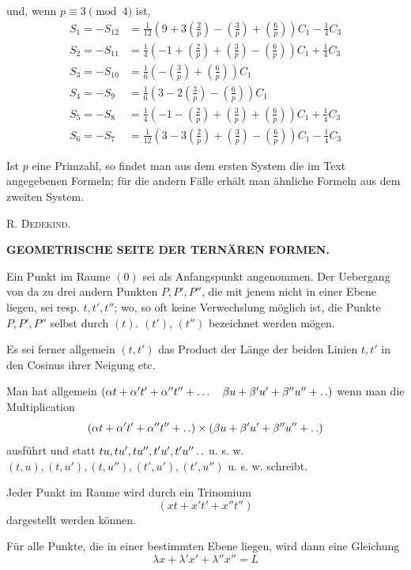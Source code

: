 und, wenn $p\equiv3\pmod4$ ist,
\[
\begin{aligned}
S_1=-S_{12}&=\tfrac1{12}\left(9+3\left(\frac2p\right)-\left(\frac3p\right)+\left(\frac6p\right)\right)C_1-\tfrac14C_3\\
S_2=-S_{11}&=\tfrac14\left(-1+\left(\frac2p\right)+\left(\frac3p\right)-\left(\frac6p\right)\right)C_1+\tfrac14C_3\\
S_3=-S_{10}&=\tfrac16\left(-\left(\frac3p\right)+\left(\frac6p\right)\right)C_1\\
S_4=-S_9&=\tfrac16\left(3-2\left(\frac3p\right)-\left(\frac6p\right)\right)C_1\\
S_5=-S_8&=\tfrac14\left(-1-\left(\frac2p\right)+\left(\frac3p\right)+\left(\frac6p\right)\right)C_1+\tfrac14C_3\\
S_6=-S_7&=\tfrac1{12}\left(3-3\left(\frac2p\right)+\left(\frac3p\right)-\left(\frac6p\right)\right)C_1-\tfrac14C_3
\end{aligned}
\]

Ist $p$ eine Primzahl, so findet man aus dem ersten System die im Text angegebenen Formeln; für die andern Fälle erhält man ähnliche Formeln aus dem zweiten System.
\begin{flushright}\textsc{R. Dedekind.}\end{flushright}
\BookRule{55mm}

\clearpage
\renewcommand{\BookRunningTitle}{Geometrische Seite der ternären Formen}
%
\begin{center}\Large\bfseries GEOMETRISCHE SEITE DER TERNÄREN FORMEN.\end{center}
\BookRule{30mm}

Ein Punkt im Raume $(0)$ sei als Anfangspunkt angenommen. Der Uebergang von da zu drei andern Punkten $P,P',P''$, die mit jenem nicht in einer Ebene liegen, sei resp. $t,t',t''$; wo, so oft keine Verwechslung möglich ist, die Punkte $P,P',P''$ selbst durch $(t)$. $(t')$, $(t'')$ bezeichnet werden mögen.

Es sei ferner allgemein $(t,t')$ das Product der Länge der beiden Linien $t,t'$ in den Cosinus ihrer Neigung etc.

Man hat allgemein $(\alpha t+\alpha't'+\alpha''t''+\ldots\quad\beta u+\beta'u'+\beta''u''+\mathinner{.\,.})$ wenn man die Multiplication
\[
(\alpha t+\alpha't'+\alpha''t''+\mathinner{.\,.})\times(\beta u+\beta'u'+\beta''u''+\mathinner{.\,.})
\]
ausführt und statt $tu,\allowbreak tu',\allowbreak tu'',\allowbreak t'u',\allowbreak t'u''\mathinner{.\,.}$ u. s. w. $(t,u),\allowbreak(t,u'),\allowbreak(t,u''),\allowbreak(t',u'),\allowbreak(t',u'')$ u. s. w. schreibt.

Jeder Punkt im Raume wird durch ein Trinomium
\[
(xt+x't'+x''t'')
\]
dargestellt werden können.

Für alle Punkte, die in einer bestimmten Ebene liegen, wird dann eine Gleichung
\[
\lambda x+\lambda'x'+\lambda''x''=L
\]
